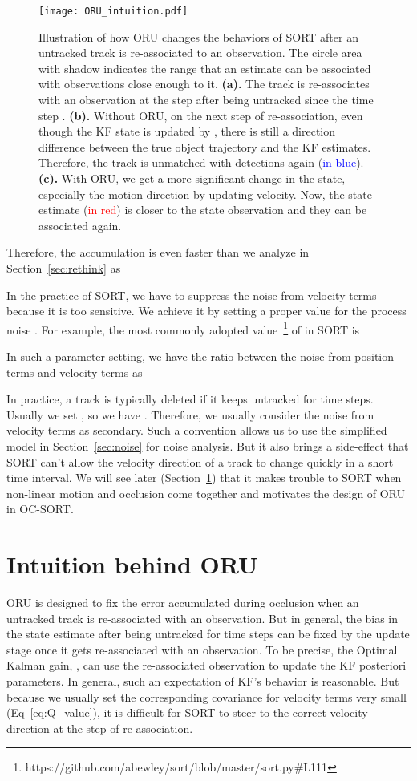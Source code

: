 \documentclass[10pt,twocolumn,letterpaper]{article}
\begin{document}
\begin{figure*}
\centering
\texttt{[image: ORU\_intuition.pdf]}
\caption{Illustration of how ORU changes the behaviors of SORT after an untracked track is re-associated to an observation. The circle area with shadow indicates the range that an estimate can be associated with observations close enough to it. \textbf{(a).} The track is re-associates with an observation  at the step  after being untracked since the time step . \textbf{(b).} Without ORU, on the next step of re-association, even though the KF state is updated by , there is still a direction difference between the true object trajectory and the KF estimates. Therefore, the track is unmatched with detections again (\textcolor{blue}{in blue}). \textbf{(c).} With ORU, we get a more significant change in the state, especially the motion direction by updating velocity. Now, the state estimate (\textcolor{red}{in red}) is closer to the state observation and they can be associated again.}
\label{fig:oru_intuition}
\end{figure*}

Therefore, the accumulation is even faster than we analyze in Section~\ref{sec:rethink} as 

In the practice of SORT, we have to suppress the noise from velocity terms because it is too sensitive. We achieve it by setting a proper value for the process noise . For example, the most commonly adopted value~\footnote{https://github.com/abewley/sort/blob/master/sort.py\#L111} of  in SORT is


In such a parameter setting, we have the ratio between the noise from position terms and velocity terms as

In practice, a track is typically deleted if it keeps untracked for  time steps. Usually we set , so we have . 
Therefore, we usually consider the noise from velocity terms as secondary. Such a convention allows us to use the simplified model in Section~\ref{sec:noise} for noise analysis. But it also brings a side-effect that SORT can't allow the velocity direction of a track to change quickly in a short time interval.
We will see later (Section~\ref{sec:oru_intuition}) that it makes trouble to SORT when non-linear motion and occlusion come together and motivates the design of ORU in OC-SORT.


\section{Intuition behind ORU}
\label{sec:oru_intuition}
ORU is designed to fix the error accumulated during occlusion when an untracked track is re-associated with an observation. But in general, the bias in the state estimate  after being untracked for  time steps can be fixed by the update stage once it gets re-associated with an observation. To be precise, the Optimal Kalman gain, \ie , can use the re-associated observation to update the KF posteriori parameters. In general, such an expectation of KF's behavior is reasonable. But because we usually set the corresponding covariance for velocity terms very small (Eq~\ref{eq:Q_value}), it is difficult for SORT to steer to the correct velocity direction at the step of re-association.
\end{document}

